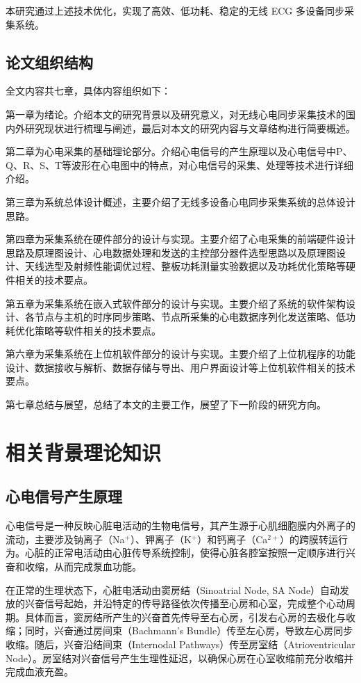 本研究通过上述技术优化，实现了高效、低功耗、稳定的无线 ECG 多设备同步采集系统。

\subsection{论文组织结构}

全文内容共七章，具体内容组织如下：

第一章为绪论。介绍本文的研究背景以及研究意义，对无线心电同步采集技术的国内外研究现状进行梳理与阐述，最后对本文的研究内容与文章结构进行简要概述。

第二章为心电采集的基础理论部分。介绍心电信号的产生原理以及心电信号中P、Q、R、S、T等波形在心电图中的特点，对心电信号的采集、处理等技术进行详细介绍。

第三章为系统总体设计概述，主要介绍了无线多设备心电同步采集系统的总体设计思路。

第四章为采集系统在硬件部分的设计与实现。主要介绍了心电采集的前端硬件设计思路及原理图设计、心电数据处理和发送的主控部分器件选型思路以及原理图设计、天线选型及射频性能调优过程、整板功耗测量实验数据以及功耗优化策略等硬件相关的技术要点。

第五章为采集系统在嵌入式软件部分的设计与实现。主要介绍了系统的软件架构设计、各节点与主机的时序同步策略、节点所采集的心电数据序列化发送策略、低功耗优化策略等软件相关的技术要点。

第六章为采集系统在上位机软件部分的设计与实现。主要介绍了上位机程序的功能设计、数据接收与解析、数据存储与导出、用户界面设计等上位机软件相关的技术要点。

第七章总结与展望，总结了本文的主要工作，展望了下一阶段的研究方向。

\newpage    %

\section{相关背景理论知识}

\subsection{心电信号产生原理}

心电信号是一种反映心脏电活动的生物电信号，其产生源于心肌细胞膜内外离子的流动，主要涉及钠离子（Na$^+$）、钾离子（K$^+$）和钙离子（Ca$^{2+}$）的跨膜转运行为。心脏的正常电活动由心脏传导系统控制，使得心脏各腔室按照一定顺序进行兴奋和收缩，从而完成泵血功能。

在正常的生理状态下，心脏电活动由窦房结（Sinoatrial Node, SA Node）自动发放的兴奋信号起始，并沿特定的传导路径依次传播至心房和心室，完成整个心动周期。具体而言，窦房结所产生的兴奋首先传导至右心房，引发右心房的去极化与收缩；同时，兴奋通过房间束（Bachmann’s Bundle）传至左心房，导致左心房同步收缩。随后，兴奋沿结间束（Internodal Pathways）传至房室结（Atrioventricular Node）。房室结对兴奋信号产生生理性延迟，以确保心房在心室收缩前充分收缩并完成血液充盈。

